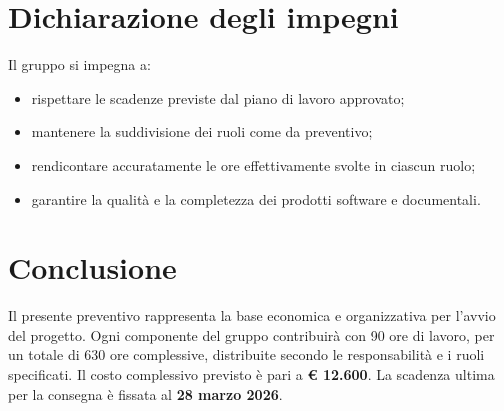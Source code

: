\documentclass[a4paper, 11pt, oneside]{scrartcl} %
\begin{document}
\section{Dichiarazione degli impegni}

Il gruppo si impegna a:
\begin{itemize}
    \item rispettare le scadenze previste dal piano di lavoro approvato;
    \item mantenere la suddivisione dei ruoli come da preventivo;
    \item rendicontare accuratamente le ore effettivamente svolte in ciascun ruolo;
    \item garantire la qualità e la completezza dei prodotti software e documentali.
\end{itemize}

\section{Conclusione}

Il presente preventivo rappresenta la base economica e organizzativa per l’avvio del progetto.  
Ogni componente del gruppo contribuirà con 90 ore di lavoro, per un totale di 630 ore complessive, distribuite secondo le responsabilità e i ruoli specificati.  
Il costo complessivo previsto è pari a \textbf{€ 12.600}.  
La scadenza ultima per la consegna è fissata al \textbf{28 marzo 2026}.
\end{document}

